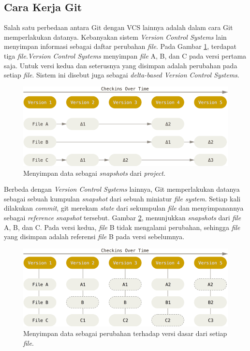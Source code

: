\subsection{Cara Kerja Git}
\label{subsec:cara_kerja_git}
Salah satu perbedaan antara Git dengan VCS lainnya adalah dalam cara Git memperlakukan datanya. Kebanyakan sistem \textit{Version Control Systems} lain menyimpan informasi sebagai daftar perubahan \textit{file}. Pada Gambar \ref{fig:deltas}, terdapat tiga \textit{file}.\textit{Version Control Systems} menyimpan \textit{file} A, B, dan C pada versi pertama saja. Untuk versi kedua dan seterusnya yang disimpan adalah perubahan pada setiap \textit{file}. Sistem ini disebut juga sebagai \textit{delta-based Version Control Systems}. 
\begin{figure}[H]
	\centering
		\includegraphics[scale=0.5]{Gambar/deltas.png}
	\caption{Menyimpan data sebagai \textit{snapshots} dari \textit{project}\cite{chacon2014pro}.}
	\label{fig:deltas}
\end{figure}


Berbeda dengan \textit{Version Control Systems} lainnya, Git memperlakukan datanya sebagai sebuah kumpulan \textit{snapshot} dari sebuah miniatur \textit{file system}. Setiap kali dilakukan \textit{commit}, git merekam \textit{state} dari sekumpulan \textit{file} dan menyimpanannya sebagai \textit{reference} \textit{snapshot} tersebut. Gambar \ref{fig:snapshots}, menunjukkan \textit{snapshots} dari \textit{file} A, B, dan C. Pada versi kedua, \textit{file} B tidak mengalami perubahan, sehingga \textit{file} yang disimpan adalah referensi \textit{file} B pada versi sebelumnya.
\begin{figure}[H]
	\centering
		\includegraphics[scale=0.5]{Gambar/snapshots.png}
	\caption{Menyimpan data sebagai perubahan terhadap versi dasar dari setiap \textit{file}\cite{chacon2014pro}.}
	\label{fig:snapshots}
\end{figure}

